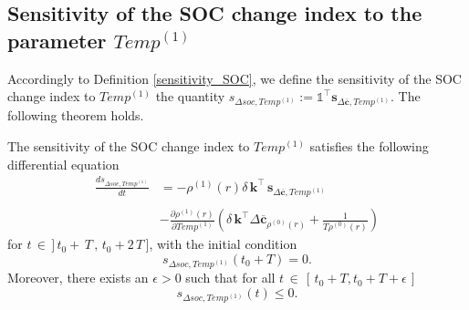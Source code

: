  
 
\subsection{Sensitivity of the SOC change index to the parameter $Temp^{(1)}$ }\label{subsection:sensitivity to Temp}
Accordingly to Definition \ref{sensitivity_SOC}, we define   the sensitivity of the SOC change index  to $Temp^{(1)}$
 the quantity $s_{\Delta soc,Temp^{(1)}}:=  \mathds{1}^\intercal \mathbf{s}_{\Delta \mathbf{\overline c},Temp^{(1)}}$. The following theorem holds.
 \begin{theorem}\label{thm: sensitivity to Temp}
 The sensitivity of the SOC change index   to $Temp^{(1)}$ satisfies the following differential equation
 \begin{equation}\label{eq:ode delta SOC sensitivity to Temp^n}
\begin{array}{ll}
    \displaystyle \frac{d s_{\Delta soc,Temp^{(1)}}}{dt} &=  -\rho^{(1)}(r)\delta\, \mathbf{k}^\intercal \, \mathbf{s}_{\Delta \mathbf{\overline c},Temp^{(1)}}\\\\
&-\displaystyle \frac{\partial\rho^{(1)}(r)}{\partial Temp^{(1)}}\left(\delta \,\mathbf{k}^\intercal \Delta \mathbf{\overline c}_{\rho^{(0)}(r)}+\displaystyle \frac{1}{T\rho^{(0)}(r)} \right)
\end{array}
\end{equation}
for $t\,\in\,]\,t_0+\,T \,,\,t_0+2\,T\,]$, with the initial condition
$$s_{\Delta soc,Temp^{(1)}}(t_0+T) = 0.$$
Moreover, there exists an $\epsilon>0$ such that for all $t\,\in \,[ \,t_0+T,t_0+T+\epsilon\,]$
$$s_{\Delta soc,Temp^{(1)}}(t)\leq 0.$$ 
 \end{theorem}
